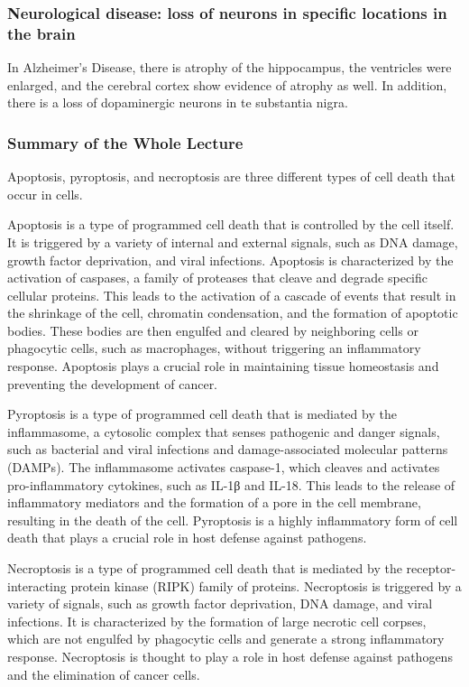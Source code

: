\begin{itemize}
\begin{itemize}
\subsubsection{Neurological disease: loss of neurons in specific locations in the brain}
In Alzheimer's Disease, there is atrophy of the hippocampus, the ventricles were enlarged, and the cerebral cortex show evidence of atrophy as well. In addition, there is a loss of dopaminergic neurons in te substantia nigra.


\subsubsection{Summary of the Whole Lecture}
Apoptosis, pyroptosis, and necroptosis are three different types of cell death that occur in cells.

Apoptosis is a type of programmed cell death that is controlled by the cell itself. It is triggered by a variety of internal and external signals, such as DNA damage, growth factor deprivation, and viral infections. Apoptosis is characterized by the activation of caspases, a family of proteases that cleave and degrade specific cellular proteins. This leads to the activation of a cascade of events that result in the shrinkage of the cell, chromatin condensation, and the formation of apoptotic bodies. These bodies are then engulfed and cleared by neighboring cells or phagocytic cells, such as macrophages, without triggering an inflammatory response. Apoptosis plays a crucial role in maintaining tissue homeostasis and preventing the development of cancer.

Pyroptosis is a type of programmed cell death that is mediated by the inflammasome, a cytosolic complex that senses pathogenic and danger signals, such as bacterial and viral infections and damage-associated molecular patterns (DAMPs). The inflammasome activates caspase-1, which cleaves and activates pro-inflammatory cytokines, such as IL-1β and IL-18. This leads to the release of inflammatory mediators and the formation of a pore in the cell membrane, resulting in the death of the cell. Pyroptosis is a highly inflammatory form of cell death that plays a crucial role in host defense against pathogens.

Necroptosis is a type of programmed cell death that is mediated by the receptor-interacting protein kinase (RIPK) family of proteins. Necroptosis is triggered by a variety of signals, such as growth factor deprivation, DNA damage, and viral infections. It is characterized by the formation of large necrotic cell corpses, which are not engulfed by phagocytic cells and generate a strong inflammatory response. Necroptosis is thought to play a role in host defense against pathogens and the elimination of cancer cells.


\end{itemize}
\end{itemize}
